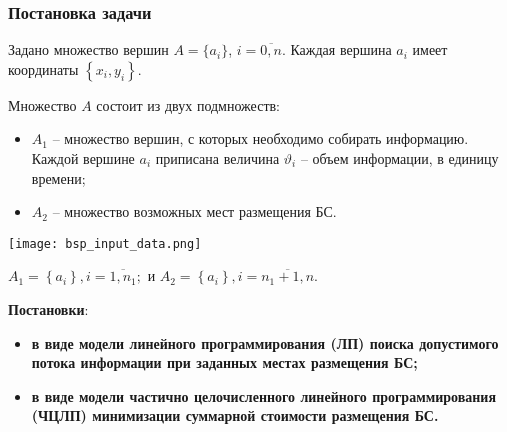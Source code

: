 \begin{frame}
    \frametitle{Постановка задачи}
    \fontsize{8pt}{7.2}\selectfont
    \justifying
    Задано множество вершин $A = \{a_i\}$, $i=\overline{0,n}$. Каждая вершина $a_i$ имеет координаты $\left\{ x_i, y_i \right\}$.
    
    \begin{minipage}[b]{0.5\linewidth}

        Множество $A$ состоит из двух подмножеств: 
        \begin{itemize}
        \item $A_1$ -- множество вершин, с которых необходимо собирать информацию. Каждой вершине $a_i$ приписана   величина $\vartheta_i$ -- объем информации, в единицу времени;
        \item $A_2$ -- множество возможных мест размещения БС. 
        \end{itemize}




    \end{minipage}     
    \hfill
    \begin{minipage}[b]{0.5\linewidth}
        \texttt{[image: bsp\_input\_data.png]}
    \end{minipage}
    \medskip

    $
    A_1 = \left\{a_i \right\}, i= \overline{1,n_1};
    $ и $
    A_2 = \left\{ a_i  \right\}, i= \overline{n_1+1,n}.
    $
    
    \bigskip 

    \textbf{Постановки}:
    \begin{itemize}
        \item \textbf{в виде модели линейного программирования (ЛП) поиска допустимого потока информации при заданных местах размещения БС;}
        \item \textbf{в виде модели частично целочисленного линейного программирования (ЧЦЛП) минимизации суммарной стоимости размещения  БС.}
    \end{itemize}

\end{frame}



